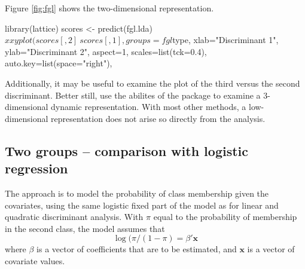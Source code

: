 Figure \ref{fig:fgl} shows the two-dimensional
representation.
\begin{Schunk}
\begin{Sinput}
library(lattice)
scores <- predict(fgl.lda)$x
xyplot(scores[,2] ~ scores[,1], groups=fgl$type,
       xlab="Discriminant 1",
       ylab="Discriminant 2",
       aspect=1, scales=list(tck=0.4),
       auto.key=list(space="right"),
\end{Sinput}
\end{Schunk}

Additionally, it may be useful to examine the plot of the third
versus the second discriminant.  Better still, use the abilites of the
 package to examine a 3-dimensional dynamic representation.
With most other methods, a low-dimensional representation does not
arise so directly from the analysis.

\subsection*{Two groups -- comparison with logistic regression}


The approach is to model the probability of class membership given
the covariates, using the same logistic fixed part of the model as
for linear and quadratic discriminant analysis.  With $\pi$ equal
to the probability of membership in the second class, the model
assumes that
\[ \log(\pi/(1-\pi) = \beta' \mathbf{x}\]
where $\beta$ is a vector of  coefficients that are to be estimated,
and $\mathbf{x}$ is a vector of covariate values.

